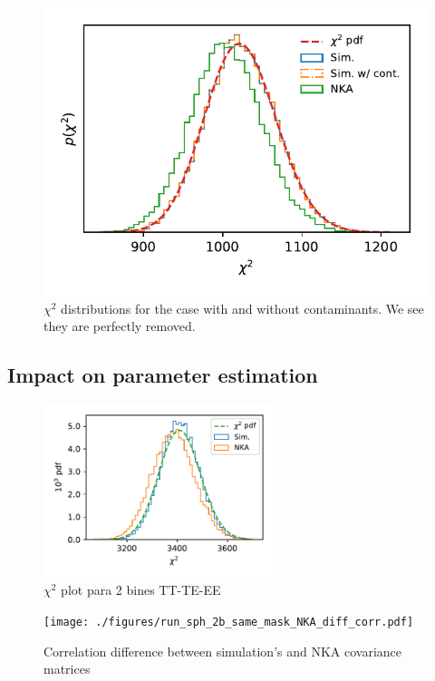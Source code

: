 \documentclass[a4paper,11pt]{article}
\begin{document}
\begin{figure}[htb]
  \centering
  \includegraphics{./figures/contaminants_chi2.pdf}
  \caption{$\chi^2$ distributions for the case with and without contaminants.
    We see they are perfectly removed.}
  \label{fig:chi2_conts}
\end{figure}

\subsection{Impact on parameter estimation}

\begin{figure}[htb]
  \centering
  \includegraphics[width=0.6\textwidth]{./figures/run_sph_2b_same_mask_NKA_TTTEEE_Full_chi2.pdf}
  \caption{$\chi^2$ plot para 2 bines TT-TE-EE}
  \label{fig:chi2_2bins}
\end{figure}

\begin{figure}[htb]
  \centering
  \texttt{[image: ./figures/run\_sph\_2b\_same\_mask\_NKA\_diff\_corr.pdf]}
  \caption{Correlation difference between simulation's and NKA covariance
    matrices}
  \label{fig:corr_diff_2bins}
\end{figure}
\end{document}
